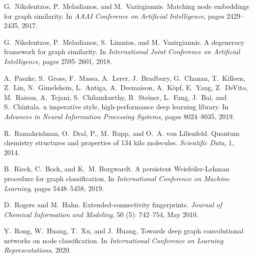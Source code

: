 \documentclass{article}
\theoremstyle{definition}
\begin{document}
\begin{thebibliography}{125}
	G.~Nikolentzos, P.~Meladianos, and M.~Vazirgiannis.
	\newblock Matching node embeddings for graph similarity.
	\newblock In \emph{AAAI Conference on Artificial Intelligence}, pages
	2429--2435, 2017.
	
	G.~Nikolentzos, P.~Meladianos, S.~Limnios, and M.~Vazirgiannis.
	\newblock A degeneracy framework for graph similarity.
	\newblock In \emph{International Joint Conference on Artificial Intelligence},
	pages 2595--2601, 2018.
	
	A.~Paszke, S.~Gross, F.~Massa, A.~Lerer, J.~Bradbury, G.~Chanan, T.~Killeen,
	Z.~Lin, N.~Gimelshein, L.~Antiga, A.~Desmaison, A.~K{\"{o}}pf, E.~Yang,
	Z.~DeVito, M.~Raison, A.~Tejani, S.~Chilamkurthy, B.~Steiner, L.~Fang,
	J.~Bai, and S.~Chintala.
	n imperative style, high-performance deep learning
	library.
	\newblock In \emph{Advances in Neural Information Processing Systems}, pages
	8024--8035, 2019.
	
	R.~Ramakrishnan, O.~Dral, P., M.~Rupp, and O.~A. von Lilienfeld.
	\newblock Quantum chemistry structures and properties of 134 kilo molecules.
	\newblock \emph{Scientific Data}, 1, 2014.
	
	B.~Rieck, C.~Bock, and K.~M. Borgwardt.
	\newblock A persistent {Weisfeiler-Lehman} procedure for graph classification.
	\newblock In \emph{International Conference on Machine Learning}, pages
	5448--5458, 2019.
	
	D.~Rogers and M.~Hahn.
	\newblock Extended-connectivity fingerprints.
	\newblock \emph{Journal of Chemical Information and Modeling}, 50
	(5): 742--754, May 2010.
	
	Y.~Rong, W.~Huang, T.~Xu, and J.~Huang.
	 {Towards} deep graph convolutional networks on node
	classification.
	\newblock In \emph{International Conference on Learning Representations}, 2020.
	

\end{thebibliography}
\end{document}
